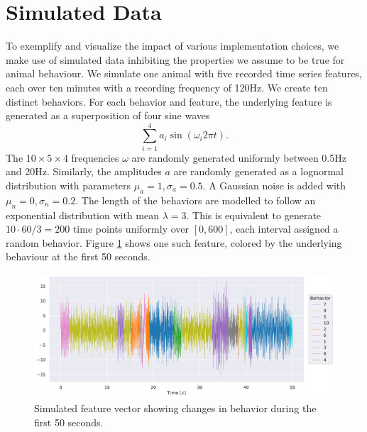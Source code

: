 \documentclass[a4paper]{memoir}
\theoremstyle{plain}
\theoremstyle{definition}
\theoremstyle{remark}
\begin{document}
\section{Simulated Data}
To exemplify and visualize the impact of various implementation choices, we make use of simulated data inhibiting the properties we assume to be true for animal behaviour.
We simulate one animal with five recorded time series features, each over ten minutes with a recording frequency of 120Hz.
We create ten distinct behaviors.
For each behavior and feature, the underlying feature is generated as a superposition of four sine waves
\begin{equation*}
        \sum_{i = 1}^{4} a_i \sin (\omega_i 2 \pi t).
\end{equation*}
The $10 \times 5 \times 4$ frequencies $\omega$ are randomly generated uniformly between 0.5Hz and 20Hz.
Similarly, the amplitudes $a$ are randomly generated as a lognormal distribution with parameters $\mu_a = 1, \sigma_a = 0.5$.
A Gaussian noise is added with $\mu_n = 0, \sigma_n = 0.2$.
The length of the behaviors are modelled to follow an exponential distribution with mean $\lambda = 3$.
This is equivalent to generate $10 \cdot 60 / 3 = 200$ time points uniformly over $[0, 600]$, each interval assigned a random behavior.
Figure \ref{fig:color_coded_feature_1} shows one such feature, colored by the underlying behaviour at the first 50 seconds.


\begin{figure}[tb]
        \centering
        \includegraphics[width=1\linewidth]{./code/figures/simulated/features/color_coded_feature_1.pdf}
        \caption{Simulated feature vector showing changes in behavior during the first 50 seconds.}
        \label{fig:color_coded_feature_1}
\end{figure}
\end{document}
